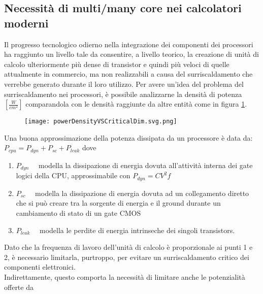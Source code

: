 \subsection{Necessità di multi/many core nei calcolatori moderni}
Il progresso tecnologico odierno nella integrazione dei componenti dei processori
ha raggiunto un livello tale da consentire, a livello teorico, la creazione di unità di calcolo 
ulteriormente più dense di transistor e quindi più veloci di quelle attualmente in commercio,
ma non realizzabili a causa del surriscaldamento che verrebbe generato durante il loro utilizzo.
Per avere un'idea del problema del surriscaldamento nei processori,
è possibile analizzarne la densità di potenza $\left[\frac{W}{cm^2}\right]$
comparandola con le densità raggiunte da altre entità come in figura \ref{fig:powerDensityVSCriticalDim}.
\begin{figure}[h!]
  \centering \texttt{[image: powerDensityVSCriticalDim.svg.png]}
  \caption[Comparazione tra la densistà di potenza di alcuni dispositivi tecnologici con dei processori intel rispetto alla loro dimensione critica,
			è possibile notare come la i valori raggiunti da alcuni modelli pentium si avvicinino a quelli di un reattore nucleare]
  \decoRule \label{fig:powerDensityVSCriticalDim}
\end{figure}
\voidLine
Una buona approssimazione della potenza dissipata da un processore è data da:
$P_{cpu} =  P_{dyn} + P_{sc} + P_{leak}$ dove 
\begin{enumerate}
	\item $P_{dyn}\quad$ modella la dissipazione di energia dovuta all'attività interna dei gate logici della CPU,
	approssimabile con $P_{dyn} = CV^2 f$
	\item $P_{sc}\quad$	 modella la dissipazione di energia 
	dovuta ad un collegamento diretto che si può creare tra la sorgente di energia e il ground durante
	un cambiamento di stato di un gate CMOS
	\item $P_{leak}\quad$ modella le perdite di energia intrinseche dei singoli transistors.
\end{enumerate}
Dato che la frequenza di lavoro dell'unità di calcolo è proporzionale ai punti 1 e 2,
è necessario limitarla, purtroppo, per evitare un surriscaldamento critico dei componenti elettronici.\\
Indirettamente, questo comporta la necessità di limitare anche le potenzialità offerte da 
